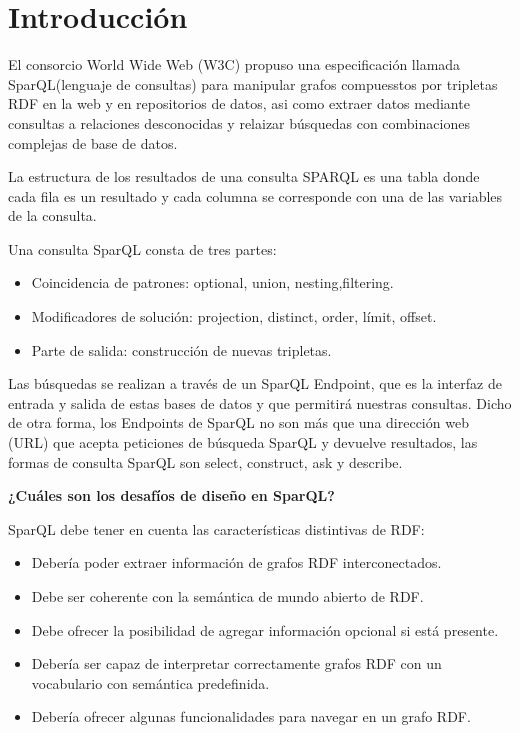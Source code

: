 \documentclass[conference]{IEEEtran}
\begin{document}
\section{Introducci\'on}
\vspace{0.2cm}
El consorcio World Wide Web (W3C) propuso una especificación llamada SparQL(lenguaje de consultas) para manipular grafos compuesstos por tripletas RDF en la web y en repositorios de datos, asi como extraer datos mediante consultas a relaciones desconocidas  y relaizar búsquedas con combinaciones complejas de base de datos.

\vspace{0.5cm}
La estructura de los resultados de una consulta SPARQL es una tabla donde cada fila es un resultado y cada columna se corresponde con una de las variables de la consulta.

Una consulta SparQL consta de tres partes:
\begin{itemize}
    \item  Coincidencia de patrones: optional, union, nesting,filtering.
    \item  Modificadores de solución: projection, distinct, order, límit, offset.
    \item  Parte de salida: construcción de nuevas tripletas.
\end{itemize}

\vspace{0.5cm}
Las búsquedas se realizan a través de un SparQL Endpoint, que es la interfaz de entrada y salida de estas bases de datos y que permitirá nuestras consultas. Dicho de otra forma, los Endpoints de SparQL no son más que una dirección web (URL) que acepta peticiones de búsqueda SparQL y devuelve resultados, las formas de consulta SparQL son select, construct, ask y describe.

\vspace{0.5cm}
\textbf{¿Cuáles son los desafíos de diseño en SparQL?}
\vspace{0.5cm}

SparQL debe tener en cuenta las características distintivas de RDF:
\begin{itemize}
    \item Debería poder extraer información de grafos RDF interconectados.
    \item Debe ser coherente con la semántica de mundo abierto de RDF.
    \item Debe ofrecer la posibilidad de agregar información opcional si está presente. 
    \item Debería ser capaz de interpretar correctamente grafos RDF con un vocabulario con semántica predefinida.
    \item Debería ofrecer algunas funcionalidades para navegar en un grafo RDF.
\end{itemize}
\end{document}

